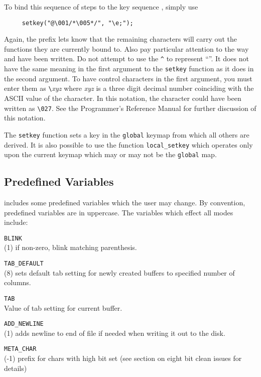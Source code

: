   To bind this sequence of steps to the key sequence , simply use
\begin{verbatim}
     setkey("@\001/*\005*/", "\e;");
\end{verbatim}

  Again, the prefix  lets \jed{} know that the remaining characters will
  carry out the functions they are currently bound to. Also pay particular
  attention to the way  and  have been written. Do
  not attempt to use the \verb|^| to represent ``''.  It does not
  have the same meaning in the first argument to the \verb|setkey| function
  as it does in the second argument.  To have control characters in the
  first argument, you must enter them as \verb|\|{\em xyz} where {\em xyz} is
  a three digit decimal number coinciding with the ASCII value of the
  character. In this notation, the  character could have been
  written as \verb|\027|.  See the \slang{} Programmer's Reference Manual for
  further discussion of this notation.

  The \verb|setkey| function sets a key in the \verb|global| keymap from
  which all others are derived.  It is also possible to use the function
  \verb|local_setkey| which operates only upon the current keymap which may
  or may not be the \verb|global| map.

\subsection{Predefined Variables}

  \jed{} includes some predefined variables which the user may change.  By
  convention, predefined variables are in uppercase.  The variables which
  effect all modes include:

      \verb|BLINK|\\
       (1) if non-zero, blink matching parenthesis.
       
      \verb|TAB_DEFAULT|\\
       (8) sets default tab setting for newly created buffers
       to specified number of columns.
       
      \verb|TAB|\\
       Value of tab setting for current buffer.

      \verb|ADD_NEWLINE|\\
       (1) adds newline to end of file if needed when writing it out to the
            disk.
            
      \verb|META_CHAR|\\
       (-1) prefix for chars with high bit set (see section on eight bit
            clean issues for details)
            
